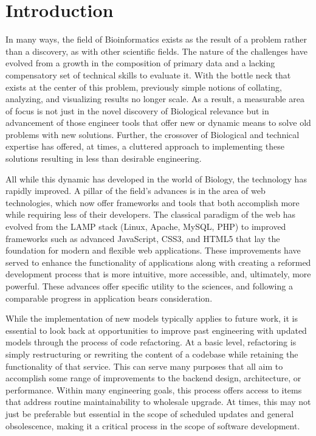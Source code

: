 \documentclass[10pt]{report}
\begin{document}
\newpage






\chapter{Introduction}
In many ways, the field of Bioinformatics exists as the result of a problem rather than a discovery, as with other scientific fields. The nature of the challenges have evolved from a growth in the composition of primary data and a lacking compensatory set of technical skills to evaluate it. With the bottle neck that exists at the center of this problem, previously simple notions of collating, analyzing, and visualizing results no longer scale. As a result, a measurable area of focus is not just in the novel discovery of Biological relevance but in advancement of those engineer tools that offer new or dynamic means to solve old problems with new solutions. Further, the crossover of Biological and technical expertise has offered, at times, a cluttered approach to implementing these solutions resulting in less than desirable engineering.

All while this dynamic has developed in the world of Biology, the technology has rapidly improved. A pillar of the field's advances is in the area of web technologies, which now offer frameworks and tools that both accomplish more while requiring less of their developers. The classical paradigm of the web has evolved from the LAMP stack (Linux, Apache, MySQL, PHP) to improved frameworks such as advanced JavaScript, CSS3, and HTML5 that lay the foundation for modern and flexible web applications. These improvements have served to enhance the functionality of applications along with creating a reformed development process that is more intuitive, more accessible, and, ultimately, more powerful. These advances offer specific utility to the sciences, and following a comparable progress in application bears consideration.

While the implementation of new models typically applies to future work, it is essential to look back at opportunities to improve past engineering with updated models through the process of code refactoring. At a basic level, refactoring is simply restructuring or rewriting the content of a codebase while retaining the functionality of that service. This can serve many purposes that all aim to accomplish some range of improvements to the backend design, architecture, or performance. Within many engineering goals, this process offers access to items that address routine maintainability to wholesale upgrade. At times, this may not just be preferable but essential in the scope of scheduled updates and general obsolescence, making it a critical process in the scope of software development.
\end{document}
